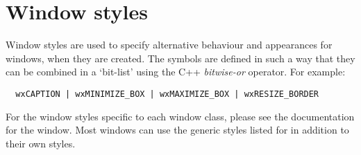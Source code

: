 
\section{Window styles}\label{windowstyles}

Window styles are used to specify alternative behaviour and appearances for windows, when they are
created. The symbols are defined in such a way that they can be combined in a `bit-list' using the
C++ {\it bitwise-or} operator. For example:

\begin{verbatim}
  wxCAPTION | wxMINIMIZE_BOX | wxMAXIMIZE_BOX | wxRESIZE_BORDER
\end{verbatim}

For the window styles specific to each window class, please see the documentation
for the window. Most windows can use the generic styles listed for  in
addition to their own styles.

